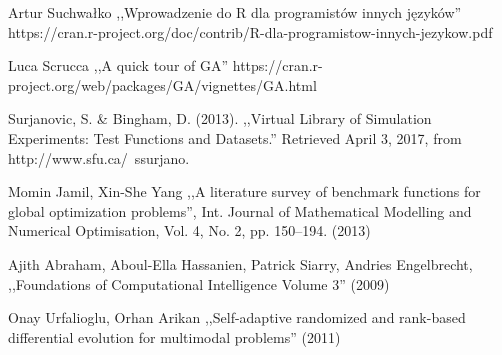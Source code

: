 \documentclass[11pt, a4paper]{article}
\begin{document}
\newpage
\begin{thebibliography}{40}

Artur Suchwałko ,,Wprowadzenie do R dla programistów innych języków'' https://cran.r-project.org/doc/contrib/R-dla-programistow-innych-jezykow.pdf

Luca Scrucca ,,A quick tour of GA''
https://cran.r-project.org/web/packages/GA/vignettes/GA.html

Surjanovic, S. \& Bingham, D. (2013). ,,Virtual Library of Simulation Experiments: Test Functions and Datasets.'' Retrieved April 3, 2017, from http://www.sfu.ca/~ssurjano.

Momin Jamil, Xin-She Yang ,,A literature survey of benchmark functions for global optimization problems'', Int. Journal of Mathematical Modelling and Numerical Optimisation, Vol. 4, No. 2, pp. 150–194. (2013)

Ajith Abraham, Aboul-Ella Hassanien, Patrick Siarry, Andries Engelbrecht, ,,Foundations of Computational Intelligence Volume 3'' (2009)

Onay Urfalioglu, Orhan Arikan ,,Self-adaptive randomized and rank-based differential evolution for multimodal problems'' (2011)

\end{thebibliography}
\end{document}
